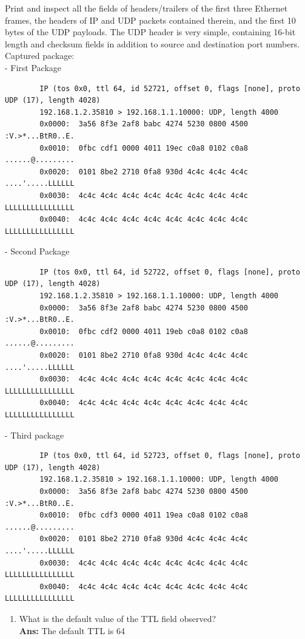 \documentclass[12pt]{article}
\newenvironment{problem}[2][Problem]{\begin{trivlist}
\item[\hskip \labelsep {\bfseries #1}\hskip \labelsep {\bfseries #2.}]}{\end{trivlist}}
\begin{document}
\begin{problem}{3}
	Print and inspect all the fields of headers/trailers of the first three Ethernet frames, the headers of IP and UDP packets contained therein, and the first 10 bytes of the UDP payloads. The UDP header is very simple, containing 16-bit length and checksum fields in addition to source and destination port numbers. 
	\\
	Captured package: \\
	- First Package
	\begin{verbatim}
	    IP (tos 0x0, ttl 64, id 52721, offset 0, flags [none], proto UDP (17), length 4028)
	    192.168.1.2.35810 > 192.168.1.1.10000: UDP, length 4000
	    0x0000:  3a56 8f3e 2af8 babc 4274 5230 0800 4500  :V.>*...BtR0..E.
	    0x0010:  0fbc cdf1 0000 4011 19ec c0a8 0102 c0a8  ......@.........
	    0x0020:  0101 8be2 2710 0fa8 930d 4c4c 4c4c 4c4c  ....'.....LLLLLL
	    0x0030:  4c4c 4c4c 4c4c 4c4c 4c4c 4c4c 4c4c 4c4c  LLLLLLLLLLLLLLLL
	    0x0040:  4c4c 4c4c 4c4c 4c4c 4c4c 4c4c 4c4c 4c4c  LLLLLLLLLLLLLLLL
	\end{verbatim}
	- Second Package
	\begin{verbatim}
	    IP (tos 0x0, ttl 64, id 52722, offset 0, flags [none], proto UDP (17), length 4028)
	    192.168.1.2.35810 > 192.168.1.1.10000: UDP, length 4000
	    0x0000:  3a56 8f3e 2af8 babc 4274 5230 0800 4500  :V.>*...BtR0..E.
	    0x0010:  0fbc cdf2 0000 4011 19eb c0a8 0102 c0a8  ......@.........
	    0x0020:  0101 8be2 2710 0fa8 930d 4c4c 4c4c 4c4c  ....'.....LLLLLL
	    0x0030:  4c4c 4c4c 4c4c 4c4c 4c4c 4c4c 4c4c 4c4c  LLLLLLLLLLLLLLLL
	    0x0040:  4c4c 4c4c 4c4c 4c4c 4c4c 4c4c 4c4c 4c4c  LLLLLLLLLLLLLLLL		
	\end{verbatim}
	- Third package
	\begin{verbatim}
	    IP (tos 0x0, ttl 64, id 52723, offset 0, flags [none], proto UDP (17), length 4028)
	    192.168.1.2.35810 > 192.168.1.1.10000: UDP, length 4000
	    0x0000:  3a56 8f3e 2af8 babc 4274 5230 0800 4500  :V.>*...BtR0..E.
	    0x0010:  0fbc cdf3 0000 4011 19ea c0a8 0102 c0a8  ......@.........
	    0x0020:  0101 8be2 2710 0fa8 930d 4c4c 4c4c 4c4c  ....'.....LLLLLL
	    0x0030:  4c4c 4c4c 4c4c 4c4c 4c4c 4c4c 4c4c 4c4c  LLLLLLLLLLLLLLLL
	    0x0040:  4c4c 4c4c 4c4c 4c4c 4c4c 4c4c 4c4c 4c4c  LLLLLLLLLLLLLLLL	
	\end{verbatim}
	\begin{enumerate}
		\item 
		What is the default value of the TTL field observed?
		\\\textbf{Ans:} The default  TTL is 64

\end{enumerate}
\end{problem}
\end{document}
